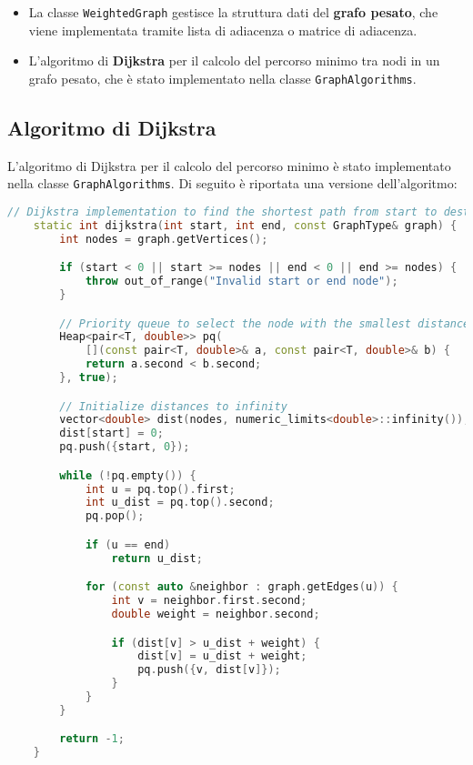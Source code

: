 \documentclass[a4paper,12pt]{article}
\begin{document}
\begin{itemize}
    \item La classe \texttt{WeightedGraph} gestisce la struttura dati del 
    \textbf{grafo pesato}, che viene implementata tramite lista di adiacenza o 
    matrice di adiacenza. 

    \item L'algoritmo di \textbf{Dijkstra} per il calcolo del percorso minimo tra nodi 
    in un grafo pesato, che è stato implementato nella classe \texttt{GraphAlgorithms}.
\end{itemize}
\clearpage

\subsection{Algoritmo di Dijkstra}

L'algoritmo di Dijkstra per il calcolo del percorso minimo è stato implementato nella 
classe \texttt{GraphAlgorithms}. 
Di seguito è riportata una versione dell'algoritmo:

\begin{lstlisting}[language=c++, label=Dijkstra]
    // Dijkstra implementation to find the shortest path from start to destination
    static int dijkstra(int start, int end, const GraphType& graph) {
        int nodes = graph.getVertices();

        if (start < 0 || start >= nodes || end < 0 || end >= nodes) {
            throw out_of_range("Invalid start or end node");
        }

        // Priority queue to select the node with the smallest distance
        Heap<pair<T, double>> pq(
            [](const pair<T, double>& a, const pair<T, double>& b) {
            return a.second < b.second;
        }, true);

        // Initialize distances to infinity
        vector<double> dist(nodes, numeric_limits<double>::infinity());
        dist[start] = 0;
        pq.push({start, 0});

        while (!pq.empty()) {
            int u = pq.top().first; 
            int u_dist = pq.top().second;
            pq.pop();

            if (u == end)
                return u_dist;

            for (const auto &neighbor : graph.getEdges(u)) {
                int v = neighbor.first.second;
                double weight = neighbor.second;

                if (dist[v] > u_dist + weight) {
                    dist[v] = u_dist + weight;
                    pq.push({v, dist[v]});
                }
            }
        }

        return -1;
    }


\end{lstlisting}
\end{document}
